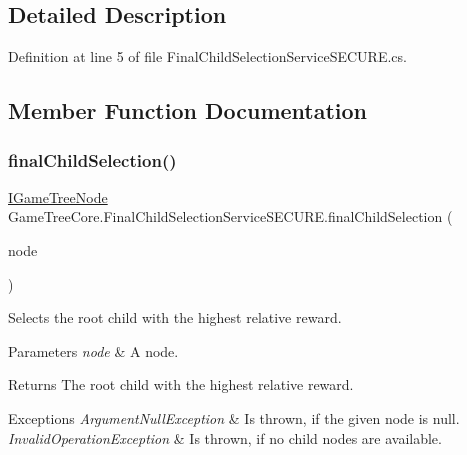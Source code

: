 \subsection{Detailed Description}


Definition at line 5 of file Final\+Child\+Selection\+Service\+S\+E\+C\+U\+R\+E.\+cs.



\subsection{Member Function Documentation}
\mbox{\label{class_game_tree_core_1_1_final_child_selection_service_s_e_c_u_r_e_a766a9bcee0b76d7f12e3093dc315bcc6}} 
\subsubsection{\texorpdfstring{final\+Child\+Selection()}{finalChildSelection()}}
{\footnotesize\ttfamily \mbox{\hyperlink{interface_game_tree_core_1_1_i_game_tree_node}{I\+Game\+Tree\+Node}} Game\+Tree\+Core.\+Final\+Child\+Selection\+Service\+S\+E\+C\+U\+R\+E.\+final\+Child\+Selection (\begin{DoxyParamCaption}\item[{\mbox{\hyperlink{interface_game_tree_core_1_1_i_game_tree_node}{I\+Game\+Tree\+Node}}}]{node }\end{DoxyParamCaption})}



Selects the root child with the highest relative reward. 


\begin{DoxyParams}{Parameters}
{\em node} & A node.\\
\hline
\end{DoxyParams}
\begin{DoxyReturn}{Returns}
The root child with the highest relative reward.
\end{DoxyReturn}

\begin{DoxyExceptions}{Exceptions}
{\em Argument\+Null\+Exception} & Is thrown, if the given node is null.\\
\hline
{\em Invalid\+Operation\+Exception} & Is thrown, if no child nodes are available.\\
\hline
\end{DoxyExceptions}


